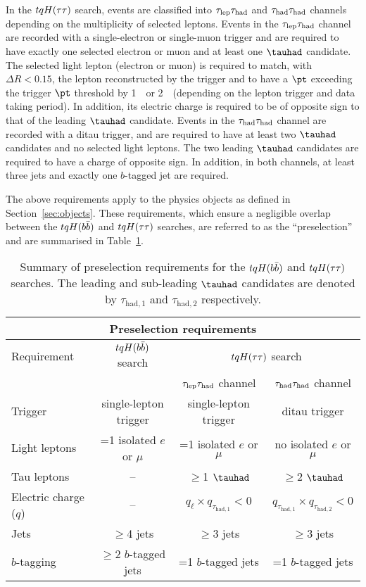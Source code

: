 In the $tqH(\tau\tau)$ search, events are classified into $\tau_{\mathrm{lep}} \tau_{\mathrm{had}}$ and $\tau_{\mathrm{had}} \tau_{\mathrm{had}}$ channels depending on the 
multiplicity of selected leptons. Events in the $\tau_{\mathrm{lep}} \tau_{\mathrm{had}}$ channel are recorded with a single-electron or single-muon trigger 
and are required to have exactly one selected electron or muon and at least one $\tauhad$ candidate. 
The selected light lepton (electron or muon) is required to match, with $\Delta R < 0.15$, the lepton reconstructed by 
the trigger and to have a $\pt$ exceeding the trigger $\pt$ threshold by 1~\gev\ or 2~\gev\ (depending on the lepton trigger and 
data taking period). In addition, its electric charge is required to be of opposite sign to that of the leading $\tauhad$ candidate.
Events in the $\tau_{\mathrm{had}} \tau_{\mathrm{had}}$ channel are recorded with a ditau trigger, and are required to have at least two $\tauhad$ candidates and 
no selected light leptons. The two leading $\tauhad$ candidates are required to have a charge of opposite sign. 
In addition, in both channels, at least three jets and exactly one $b$-tagged jet are required.

The above requirements apply to the physics objects as defined in Section~\ref{sec:objects}.
These requirements, which ensure a negligible overlap between the $tqH(b\bar{b})$ and $tqH(\tau\tau)$ searches,
are referred to as the ``preselection'' and are summarised in Table~\ref{tab:preselection}. 

\begin{table*}[t!]
\begin{center}
\begin{tabular}{l|c|cc}
\toprule\toprule
\multicolumn{4}{c}{Preselection requirements} \\      
\midrule
Requirement &  $tqH(b\bar{b})$ search & \multicolumn{2}{c}{$tqH(\tau\tau)$ search} \\      
& & $\tau_{\mathrm{lep}} \tau_{\mathrm{had}}$ channel & $\tau_{\mathrm{had}} \tau_{\mathrm{had}}$ channel \\
\midrule
Trigger & single-lepton trigger & single-lepton trigger & ditau trigger  \\
Light leptons  & =1 isolated $e$ or $\mu$ & =1 isolated $e$ or $\mu$ & no isolated $e$ or $\mu$ \\
Tau leptons & -- & $\geq$1 $\tauhad$ & $\geq$2 $\tauhad$ \\
Electric charge ($q$) & -- & $q_\ell \times q_{\tau_{\mathrm{had,1}}} < 0$ & $q_{\tau_{\mathrm{had,1}}} \times q_{\tau_{\mathrm{had,2}}} < 0$ \\
Jets  &  $\geq$4 jets & $\geq$3 jets & $\geq$3 jets \\
$b$-tagging & $\geq$2 $b$-tagged jets & =1 $b$-tagged jets & =1 $b$-tagged jets  \\
\bottomrule\bottomrule
\end{tabular}
\caption{\small{Summary of preselection requirements for the $tqH(b\bar{b})$ and $tqH(\tau\tau)$ searches. 
The leading and sub-leading $\tauhad$ candidates are denoted by $\tau_{\mathrm{had,1}}$ and $\tau_{\mathrm{had,2}}$ respectively.}}
\label{tab:preselection}
\end{center}
\end{table*}
